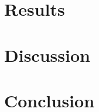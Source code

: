 \documentclass[a4paper,fleqn]{cas-sc}
\begin{document}
\section{Results}
\label{sec:results}


\section{Discussion}
\label{sec:discussion}


\section{Conclusion}
\label{sec:conclusion}
\end{document}
